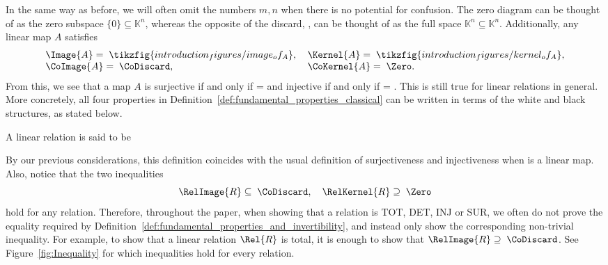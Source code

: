 \documentclass[manyauthors]{fundam}
\def\K{\mathbb{K}}
\begin{document}
In the same way as before, we will often omit the numbers $m,n$ when there is no potential for confusion. The zero diagram  can be thought of as the zero subspace $\{0\} \subseteq \K^n$, whereas the opposite of the discard, , can be thought of as the full space $\K^n \subseteq \K^n$.
Additionally, any linear map $A$ satisfies
\begin{equation}\label{eq:map_equations}
\begin{tabular}{l l}
    $\Image{A} = \; \tikzfig{introduction_figures/image_of_A}$, & $\Kernel{A} = \; \tikzfig{introduction_figures/kernel_of_A}$, \\
    $\CoImage{A} = \; \CoDiscard$, & $\CoKernel{A} = \; \Zero$.
\end{tabular}
\end{equation}
From this, we see that a map $A$ is surjective if and only if  = \CoDiscard and injective if and only if  = \Zero. This is still true for linear relations in general. More concretely, all four properties in Definition~\ref{def:fundamental_properties_classical} can be written in terms of the white and black structures, as stated below.
\begin{proposition}
  \label{def:fundamental_properties_and_invertibility}
  A linear relation  is said to be
\begin{center}
\renewcommand{\arraystretch}{2.0}
\end{center}
\end{proposition}

\noindent By our previous considerations, this definition coincides with the usual definition of surjectiveness and injectiveness when  is a linear map.
Also, notice that the two inequalities
\begin{equation}
    \RelImage{R} \subseteq \; \CoDiscard, \quad \RelKernel{R} \supseteq \; \Zero
\end{equation}
hold for any relation.
Therefore, throughout the paper, when showing that a relation is TOT, DET, INJ or SUR, we often do not prove the equality required by Definition~\ref{def:fundamental_properties_and_invertibility}, and instead only show the corresponding non-trivial inequality. For example, to show that a linear relation $\Rel{R}$ is total, it is enough to show that $\RelImage{R} \supseteq \; \CoDiscard$.
See Figure~\ref{fig:Inequality} for which inequalities hold for every relation.
\end{document}
